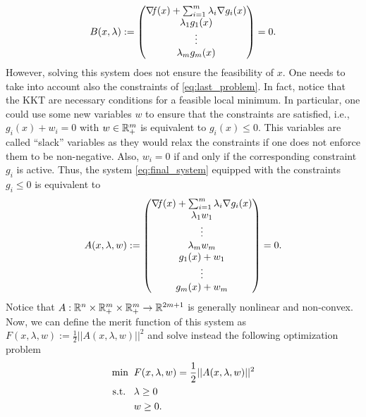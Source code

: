 \documentclass[10pt,a4paper]{article}
\begin{document}
\begin{equation}\label{eq:final_system}
	B (x,\lambda) :=
	\begin{pmatrix}
		\operatorname*{\mathit{\nabla \!f}}(x)+ \sum_{i=1}^{m} \lambda_i \nabla g_i(x)\\
		\lambda_1 g_1(x)\\
		\vdots\\
		\lambda_m g_m(x)\\
	\end{pmatrix}=0.
\end{equation}
However, solving this system does not ensure the feasibility of $x$. One needs to take into account also the constraints of \eqref{eq:last_problem}. In fact, notice that the KKT are necessary conditions for a feasible local minimum. In particular, one could use some new variables $w$ to ensure that the constraints are satisfied, i.e., $g_i(x)+w_i=0$ with $w\in \mathbb{R}^m_+$ is equivalent to $g_i(x)\leq 0$. This variables are called ``slack'' variables as they would relax the constraints if one does not enforce them to be non-negative. Also, $w_i=0$ if and only if the corresponding constraint $g_i$ is active. Thus, the system \eqref{eq:final_system} equipped with the constraints $g_i\leq 0$ is equivalent to 
\begin{equation*}
	A (x,\lambda,w) :=
	\begin{pmatrix}
		\operatorname*{\mathit{\nabla \!f}}(x)+ \sum_{i=1}^{m} \lambda_i \nabla g_i(x)\\
		\lambda_1 w_1\\
		\vdots\\
		\lambda_m w_m\\
		g_1(x) + w_1\\
		\vdots\\
		g_m(x) +w_m\\
	\end{pmatrix}=0.
\end{equation*}
Notice that $A:\mathbb{R}^n\times\mathbb{R}^m_+\times\mathbb{R}^m_+\to \mathbb{R}^{2m+1}$ is generally nonlinear and non-convex. Now, we can define the merit function of this system as $F(x,\lambda,w) := \frac{1}{2}||A(x,\lambda,w)||^2$ and solve instead the following optimization problem
\begin{equation*}
	\begin{split}
		\min \;\; &F(x,\lambda, w)= \frac{1}{2}||A(x,\lambda,w)||^2\\
		\text{s.t.} \;\;\;& \lambda\geq 0\\
		& w\geq 0.
	\end{split}
\end{equation*}
\end{document}
